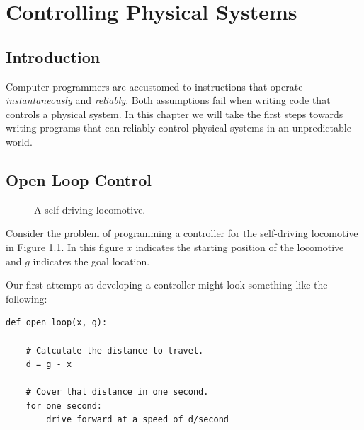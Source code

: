 \chapter{Controlling Physical Systems}
\label{chap:pid}

\section{Introduction}

Computer programmers are accustomed to instructions that operate
\emph{instantaneously} and \emph{reliably}. Both assumptions fail when
writing code that controls a physical system. In this chapter we will
take the first steps towards writing programs that can reliably
control physical systems in an unpredictable world.


\section{Open Loop Control}

\begin{figure}
\begin{center}
\end{center}
\caption{A self-driving locomotive.}
\label{fig:locomotive1}
\end{figure}


Consider the problem of programming a controller for the self-driving
locomotive in Figure \ref{fig:locomotive1}.  In this figure $x$
indicates the starting position of the locomotive and $g$ indicates
the goal location.

Our first attempt at developing a controller might look something like
the following:

\begin{minipage}[c]{0.95\textwidth}
\begin{lstlisting}[label={lst:open-loop},caption={Open Loop Control Algorithm}]
def open_loop(x, g):

    # Calculate the distance to travel.
    d = g - x

    # Cover that distance in one second.
    for one second:
        drive forward at a speed of d/second
\end{lstlisting}
\end{minipage}

